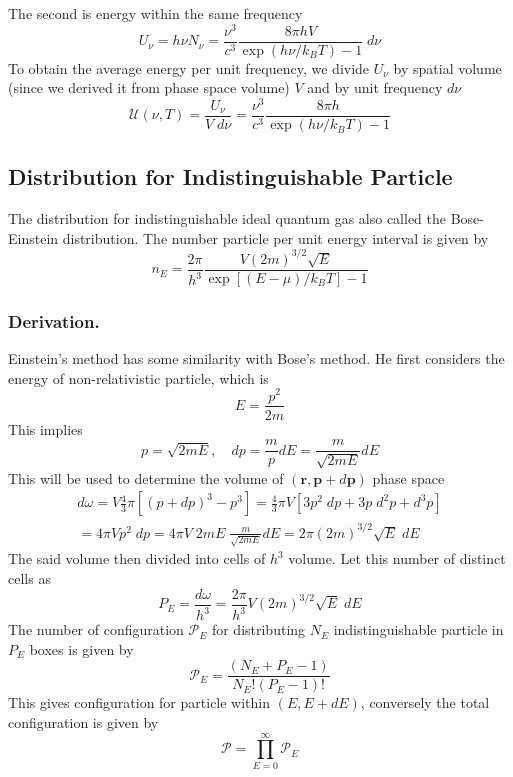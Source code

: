 \documentclass[../../../Main.tex]{subfiles}
\begin{document}
The second is energy within the same frequency
\begin{equation*}
    U_\nu=h\nu N_\nu =\frac{\nu^3}{c^3}\frac{8\pi h V}{\exp(h\nu/k_BT)-1}\;d\nu
\end{equation*}
To obtain the average energy per unit frequency, we divide $U_\nu$ by spatial volume (since we derived it from phase space volume) $V$ and by unit frequency $d\nu$
\begin{equation*}
    \mathcal{U}(\nu,T)=\frac{U_\nu}{V\;d\nu}=\frac{\nu^3}{c^3}\frac{8\pi h}{\exp(h\nu/k_BT)-1}
\end{equation*}

\subsection*{Distribution for Indistinguishable Particle}
The distribution for indistinguishable ideal quantum gas also called the Bose-Einstein distribution. The number particle per unit energy interval is given by 
\begin{equation*}
    n_E=\frac{2\pi}{h^3} \frac{V (2m)^{3/2}\sqrt{E}}{\exp\left[(E-\mu)/k_BT\right]-1}
\end{equation*}

\subsubsection*{Derivation.} Einstein's method has some similarity with Bose's method. He first considers the energy of non-relativistic particle, which is 
\begin{equation*}
    E=\frac{p^2}{2m}
\end{equation*}
This implies
\begin{equation*}
    p=\sqrt{2mE},\quad dp=\frac{m}{p}dE=\frac{m}{\sqrt{2mE}}dE
\end{equation*}
This will be used to determine the volume of $(\mathbf{r},\mathbf{p}+ d\mathbf{p})$ phase space
\begin{multline*}
    d\omega=V \frac{4}{3}\pi\left[(p+dp)^3-p^3\right] = \frac{4}{3}\pi V\left[3p^2\;dp+3p\;d^2p+d^3p\right]\\
    =4\pi Vp^2\;dp =4\pi V \;2mE\;\frac{m}{\sqrt{2mE}}dE=2\pi(2m)^{3/2}\sqrt{E}\;dE
\end{multline*} 
The said volume then divided into cells of $h^3$ volume. Let this number of distinct cells as 
\begin{equation*}
    P_E=\frac{d\omega}{h^3}=\frac{2\pi}{h^3}V(2m)^{3/2}\sqrt{E}\;dE
\end{equation*}
The number of configuration $\mathcal{P}_E$ for distributing $N_E$ indistinguishable particle in $P_E$ boxes is given by 
\begin{equation*}
    \mathcal{P}_E=\frac{(N_E+P_E-1)}{N_E! (P_E-1)!}
\end{equation*}
This gives configuration for particle within $(E,E+dE)$, conversely the total configuration is given by 
\begin{equation*}
    \mathcal{P}=\prod_{E=0}^{\infty}\mathcal{P}_E
\end{equation*}
\end{document}
